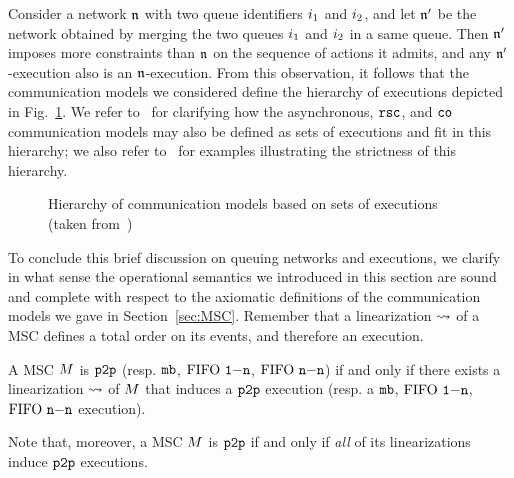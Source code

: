 Consider a network $\mathfrak{n}$ with two queue identifiers $i_1$ and $i_2$,
and let $\mathfrak{n}'$ be the network obtained by merging the two queues $i_1$ and $i_2$ in a
same queue. Then $\mathfrak{n}'$ imposes more constraints than $\mathfrak{n}$ on the sequence of actions it admits,
and any $\mathfrak{n}'$-execution also is an $\mathfrak{n}$-execution. From this observation, it follows that
the communication models we considered define the hierarchy of executions depicted in
Fig.~\ref{fig:hierarchy-of-executions}. We refer
to~\cite{DBLP:journals/fac/ChevrouHQ16}
for clarifying how the asynchronous, $\mathtt{rsc}$, and $\mathtt{co}$ communication models may
also be defined as sets of executions and fit in this hierarchy; we also refer
to~\cite{DBLP:journals/fac/ChevrouHQ16} for examples illustrating
the strictness of this hierarchy.

\begin{figure}
    
    \caption{\label{fig:hierarchy-of-executions} Hierarchy of communication models based on  sets of
    executions (taken from~\cite{DBLP:journals/fac/ChevrouHQ16})}
\end{figure}

To conclude this brief discussion on queuing networks and executions, we clarify in what sense the operational semantics we introduced in this section are sound and complete with respect to the axiomatic definitions of the communication models we gave in Section~\ref{sec:MSC}. Remember that a linearization $\rightsquigarrow$ of a MSC
defines a total order on its events, and therefore an execution.

\begin{fact}
A MSC $M$ is $\mathtt{p2p}$ (resp. $\mathtt{mb}$, $\text{FIFO } \mathtt{1\mathsf{-}n}$, $\text{FIFO } \mathtt{n\mathsf{-}n}$) if and only if there exists
a linearization $\rightsquigarrow$ of $M$ that induces a $\mathtt{p2p}$ execution (resp. a $\mathtt{mb}$, $\text{FIFO } \mathtt{1\mathsf{-}n}$, $\text{FIFO } \mathtt{n\mathsf{-}n}$ execution).
\end{fact}

Note that, moreover, a MSC $M$ is $\mathtt{p2p}$ if and only if \emph{all} of its linearizations induce $\mathtt{p2p}$ executions.